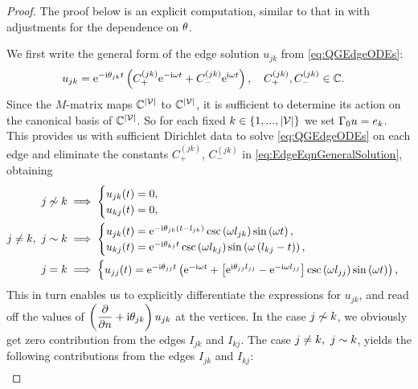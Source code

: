 \begin{proof}
	The proof below is an explicit computation, similar to that in \cite{ershova2014isospectrality} with adjustments for the dependence on $\theta$.
	
	We first write the general form of the edge solution $u_{jk}$ from \eqref{eq:QGEdgeODEs}:
	\begin{align} \label{eq:EdgeEqnGeneralSolution}
		u_{jk} &= \mathrm{e}^{-\mathrm{i}\theta_{jk}t}\left(  C_{+}^{(jk)}\mathrm{e}^{-\mathrm{i}\omega t} + C_{-}^{(jk)}\mathrm{e}^{\mathrm{i}\omega t}  \right),
		\quad C_{+}^{(jk)}, C_{-}^{(jk)}\in\mathbb{C}.
	\end{align}
	Since the $M$-matrix maps $\mathbb{C}^{\left\lvert \mathcal{V} \right\rvert}$ to $\mathbb{C}^{\left\lvert \mathcal{V} \right\rvert}$, it is sufficient to determine its action on the canonical basis of $\mathbb{C}^{\left\lvert \mathcal{V} \right\rvert}$.
	So for each fixed $k\in\left\{ 1,...,\left\lvert \mathcal{V} \right\rvert \right\}$ we set $\Gamma_0 u = e_k$.
	This provides us with sufficient Dirichlet data to solve \eqref{eq:QGEdgeODEs} on each edge and eliminate the constants $C_{+}^{(jk)}$, $C_{-}^{(jk)}$ in \eqref{eq:EdgeEqnGeneralSolution}, obtaining
	\begin{align*}
		j\not\sim k &\implies
		\begin{cases}
			u_{jk}(t) = 0, \\
			u_{kj}(t) = 0,
		\end{cases} \\
		j\neq k, \ j\sim k &\implies
		\begin{cases}
			u_{jk}(t) = \mathrm{e}^{-\mathrm{i}\theta_{jk}\left( t-l_{jk} \right)}\csc\left( \omega l_{jk} \right)\sin\left( \omega t \right), \\
			u_{kj}(t) = \mathrm{e}^{-\mathrm{i}\theta_{kj}t}\csc\left( \omega l_{kj} \right)\sin\left( \omega \left( l_{kj}-t \right) \right),
		\end{cases} \\
		j = k &\implies 
		\begin{cases}
			u_{jj}(t) = \mathrm{e}^{-\mathrm{i}\theta_{jj}t} \left(  \mathrm{e}^{-\mathrm{i}\omega t} + \left[ \mathrm{e}^{\mathrm{i}\theta_{jj}l_{jj}}-\mathrm{e}^{-\mathrm{i}\omega l_{jj}} \right]\csc\left( \omega l_{jj} \right)\sin\left( \omega t \right)   \right),
		\end{cases}
	\end{align*}
	This in turn enables us to explicitly differentiate the expressions for $u_{jk}$, and read off the values of $\left( \dfrac{\partial }{\partial n}+\mathrm{i}\theta_{jk} \right)u_{jk}$ at the vertices.
	In the case $j\not\sim k$, we obviously get zero contribution from the edges $I_{jk}$ and $I_{kj}$.
	The case $j\neq k, \ j\sim k$, yields the following contributions from the edges $I_{jk}$ and $I_{kj}$:
	\begin{align*}

\end{align*}
\end{proof}

